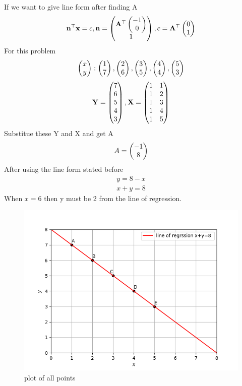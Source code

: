 \documentclass[journal,12pt,twocolumn]{IEEEtran}
\begin{document}
  If we want to give line form after finding A
  \begin{align}
  	\mathbf{n}^{\top}\mathbf{x}=c, \mathbf{n}=\begin{pmatrix}\mathbf{A}^{\top}\begin{pmatrix}-1\\0\end{pmatrix}\\1\end{pmatrix},c=\mathbf{A}^{\top}\begin{pmatrix}0\\1\end{pmatrix}
  \end{align}
	For this problem 
	\begin{align}
		\begin{pmatrix}x \\y \end{pmatrix}:
	\begin{pmatrix}1 \\7 \end{pmatrix},
	\begin{pmatrix}2 \\6 \end{pmatrix},
	\begin{pmatrix}3 \\5 \end{pmatrix},
    \begin{pmatrix}4 \\4 \end{pmatrix},
    \begin{pmatrix}5 \\3 \end{pmatrix}
	\end{align}
\begin{align}
	\mathbf{Y}=\begin{pmatrix}7\\6\\5\\4\\3\end{pmatrix},
	\mathbf{X}=\begin{pmatrix}1&1\\1&2\\1&3\\1&4\\1&5\end{pmatrix}
\end{align}
Substitue these Y and X and get A 
\begin{align}
	A=\begin{pmatrix}-1\\8\end{pmatrix}
\end{align}
	After using the line form stated before
	\begin{align}
		y=8-x\\
		x+y=8
	\end{align}
	When $x=6$ then y must be 2 from the line of regression.
	
	\begin{figure}[h!]
		\centering
		\includegraphics[width=\columnwidth]{./figs/fig1.png}
		\caption{plot of all points}
		\label{Fig1}
	\end{figure}
	
\end{document}
